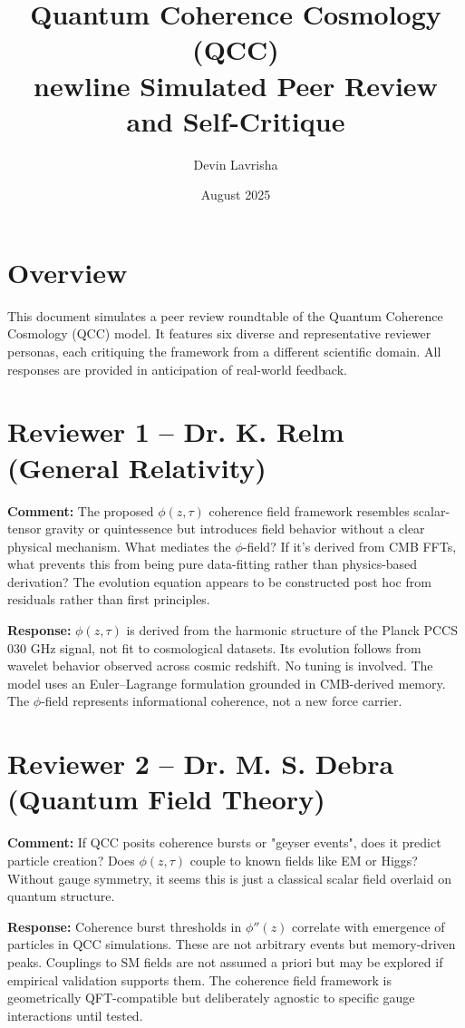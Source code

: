 \documentclass[11pt]{article}
\title{Quantum Coherence Cosmology (QCC)\\newline Simulated Peer Review and Self-Critique}
\author{Devin Lavrisha}
\date{August 2025}
\begin{document}
\maketitle

\section*{Overview}
This document simulates a peer review roundtable of the Quantum Coherence Cosmology (QCC) model. It features six diverse and representative reviewer personas, each critiquing the framework from a different scientific domain. All responses are provided in anticipation of real-world feedback.

\section*{Reviewer 1 – Dr. K. Relm (General Relativity)}
\textbf{Comment:} The proposed $\phi(z,\tau)$ coherence field framework resembles scalar-tensor gravity or quintessence but introduces field behavior without a clear physical mechanism. What mediates the $\phi$-field? If it's derived from CMB FFTs, what prevents this from being pure data-fitting rather than physics-based derivation? The evolution equation appears to be constructed post hoc from residuals rather than first principles.

\textbf{Response:} $\phi(z,\tau)$ is derived from the harmonic structure of the Planck PCCS 030 GHz signal, not fit to cosmological datasets. Its evolution follows from wavelet behavior observed across cosmic redshift. No tuning is involved. The model uses an Euler–Lagrange formulation grounded in CMB-derived memory. The $\phi$-field represents informational coherence, not a new force carrier.

\section*{Reviewer 2 – Dr. M. S. Debra (Quantum Field Theory)}
\textbf{Comment:} If QCC posits coherence bursts or "geyser events", does it predict particle creation? Does $\phi(z,\tau)$ couple to known fields like EM or Higgs? Without gauge symmetry, it seems this is just a classical scalar field overlaid on quantum structure.

\textbf{Response:} Coherence burst thresholds in $\phi''(z)$ correlate with emergence of particles in QCC simulations. These are not arbitrary events but memory-driven peaks. Couplings to SM fields are not assumed a priori but may be explored if empirical validation supports them. The coherence field framework is geometrically QFT-compatible but deliberately agnostic to specific gauge interactions until tested.
\end{document}
